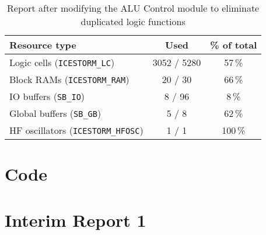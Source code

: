\documentclass[a4paper,10pt]{article}
\begin{document}
\begin{table}[H] 
    \centering
    \begin{tabularx}{0.6\textwidth}{X c c}
        \toprule
        Resource type & Used & \% of total \\ \midrule
        Logic cells (\texttt{ICESTORM\_LC}) & 3052 / 5280 & 57\,\% \\
        Block RAMs (\texttt{ICESTORM\_RAM}) & 20 / 30 & 66\,\% \\
        IO buffers (\texttt{SB\_IO}) & 8 / 96 & 8\,\% \\
        Global buffers (\texttt{SB\_GB}) & 5 / 8 & 62\,\% \\
        HF oscillators (\texttt{ICESTORM\_HFOSC}) & 1 / 1 & 100\,\% \\
        \bottomrule
    \end{tabularx}
    \caption{Report after modifying the ALU Control module
    to eliminate duplicated logic functions}
    \label{tab:ALU}
\end{table}

\section{Code}

\section{Interim Report 1}
\label{sec:{Interim_Report_1}}

\end{document}
